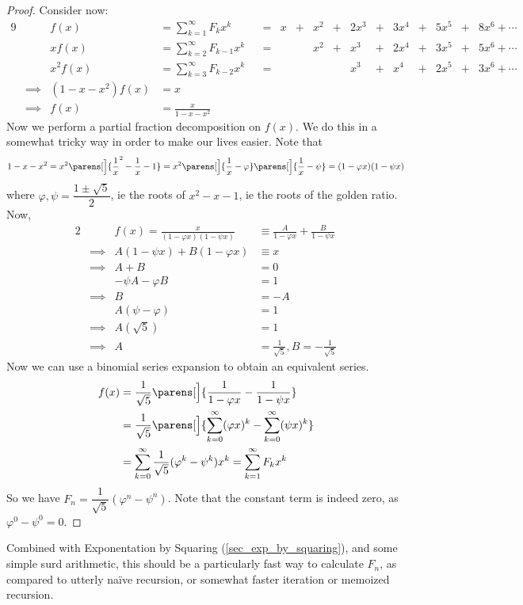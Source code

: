 \begin{proof}
Consider now:
\begin{alignat*}9
&& f(x) &= \sum_{k = 1}^\infty F_k x^k
    &&={}& x &+{}& x^2 &+{}& 2x^3 &+{}&
        3x^4 &+{}& 5x^5 &+{}& 8x^6 + \dotsb \\
&& x f(x) &= \sum_{k = 2}^\infty F_{k - 1} x^k
    &&={}& &&x^2 &+{}& x^3 &+{}& 2x^4 &+{}&
        3x^5 &+{}& 5x^6 + \dotsb \\
&& x^2 f(x) &= \sum_{k = 3}^\infty F_{k - 2}x^k
    &&={}& &&&& x^3 &+{}& x^4 &+{}& 2x^5 &+{}& 3x^6 + \dotsb \\
&\implies& (1 - x - x^2) f(x) &= x \\
&\implies& f(x) &= \frac x{1 - x - x^2}
\end{alignat*}
Now we perform a partial fraction decomposition on \(f(x)\). We do this in a
somewhat tricky way in order to make our lives easier. Note that
\begin{equation*}
1 - x - x^2 = x^2 \parens[\Big]{\frac 1x^2 - \frac 1x - 1}
    = x^2\parens[\Big]{\frac 1x - \varphi}\parens[\Big]{\frac 1x - \psi}
    = (1 - \varphi x)(1 - \psi x)
\end{equation*}
where \(\varphi, \psi = \dfrac{1 \pm \sqrt 5}2\), ie the roots of
\(x^2 - x - 1\), ie the roots of the golden ratio. Now,
\begin{alignat*}2
&& f(x) = \frac x{(1 - \varphi x)(1 - \psi x)}
    &\equiv \frac A{1 - \varphi x} + \frac B{1 - \psi x} \\
&\implies& A(1 - \psi x) + B(1 - \varphi x) &\equiv x \\
&\implies& A + B &= 0 \\
&& -\psi A - \varphi B &= 1 \\
&\implies& B &= -A  \\
&& A(\psi - \varphi) &= 1 \\
&\implies& A(\sqrt 5) &= 1 \\
&\implies& A &= \frac 1{\sqrt 5}, B = -\frac 1{\sqrt 5}
\end{alignat*}
Now we can use a binomial series expansion to obtain an equivalent series.
\begin{align*}
f(x) &= \frac 1{\sqrt 5}\parens[\Big]{\frac 1{1 - \varphi x}
                            - \frac 1{1 - \psi x}} \\
&= \frac 1{\sqrt 5}\parens[\Big]{\sum_{k = 0}^\infty (\varphi x)^k
                       - \sum_{k = 0}^\infty (\psi x)^k} \\
&= \sum_{k = 0}^\infty \frac 1{\sqrt 5}(\varphi^k - \psi^k)x^k
= \sum_{k = 1}^\infty F_k x^k
\end{align*}
So we have \(F_n = \dfrac 1{\sqrt 5}(\varphi^n - \psi^n)\). Note that the
constant term is indeed zero, as \(\varphi^0 - \psi^0 = 0\).
\end{proof}
Combined with Exponentation by Squaring (\ref{sec_exp_by_squaring}), and
some simple surd arithmetic, this should be a particularly fast way to
calculate \(F_n\), as compared to utterly na\"ive recursion, or somewhat
faster iteration or memoized recursion.

